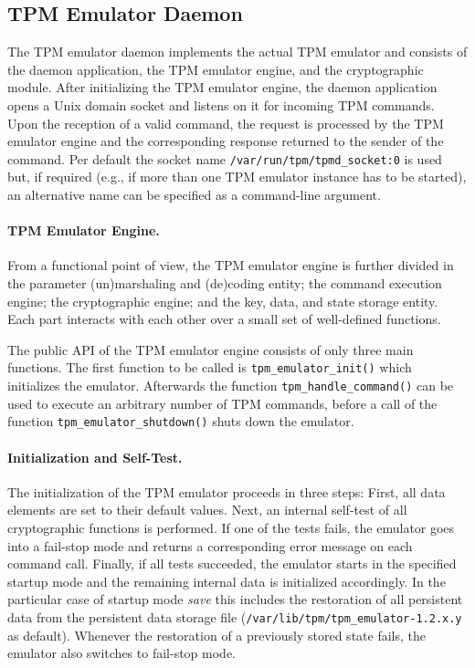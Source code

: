 \documentclass[runningheads]{llncs}
\newcommand{\file}[1]{\small\texttt{#1}\normalsize}
\newcommand{\func}[1]{\small\texttt{#1}\normalsize}
\begin{document}
\subsection{TPM Emulator Daemon}
The TPM emulator daemon implements the actual TPM emulator and consists of
the daemon application, the TPM emulator engine, and the cryptographic module.
After initializing the TPM emulator engine, the daemon application opens a
Unix domain socket and listens on it for incoming TPM commands. Upon the
reception of a valid command, the request is processed by the TPM emulator
engine and the corresponding response returned to the sender of the command.
Per default the socket name \file{/var/run/tpm/tpmd\_socket:0} is used but,
if required (e.g., if more than one TPM emulator instance has to be started),
an alternative name can be specified as a command-line argument.

\paragraph{TPM Emulator Engine.}
From a functional point of view, the TPM emulator engine is further divided
in the parameter (un)marshaling and (de)coding entity; the command execution
engine; the cryptographic engine; and the key, data, and state storage entity.
Each part interacts with each other over a small set of well-defined functions.

The public API of the TPM emulator engine consists of only three main
functions. The first function to be called is \func{tpm\_emulator\_init()}
which initializes the emulator. Afterwards the function
\func{tpm\_\-handle\_\-command()} can be used to execute an arbitrary number
of TPM commands, before a call of the function \func{tpm\_emulator\_shutdown()}
shuts down the emulator.

\paragraph{Initialization and Self-Test.}
The initialization of the TPM emulator proceeds in three steps:
First, all data elements are set to their default values.
Next, an internal self-test of all cryptographic functions
is performed. If one of the tests fails, the emulator goes into a fail-stop
mode and returns a corresponding error message on each command call. Finally,
if all tests succeeded, the emulator starts in the specified startup mode and
the remaining internal data is initialized accordingly. In the particular case
of startup mode \emph{save} this includes the restoration of all persistent
data from the persistent data storage file
(\file{/var/lib/tpm/tpm\_emulator-1.2.x.y} as default).
Whenever the restoration of a previously stored state fails, the emulator
also switches to fail-stop mode.
\end{document}
